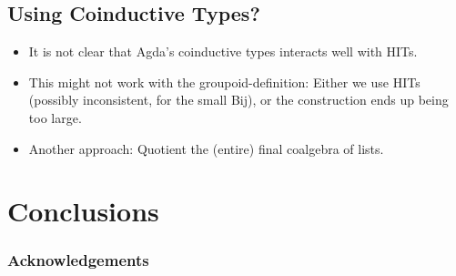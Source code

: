 \documentclass[runningheads]{llncs}
\begin{document}
\subsection{Using Coinductive Types?}

\begin{itemize}
    \item It is not clear that Agda's coinductive types
        interacts well with HITs.
    \item This might not work with the groupoid-definition:
        Either we use HITs (possibly inconsistent, for the small Bij),
        or the construction ends up being too large.
    \item
        Another approach: Quotient the (entire) final coalgebra of lists.
\end{itemize}

\section{Conclusions}

%
%
\subsubsection{Acknowledgements}

\nocite{*}



\end{document}
